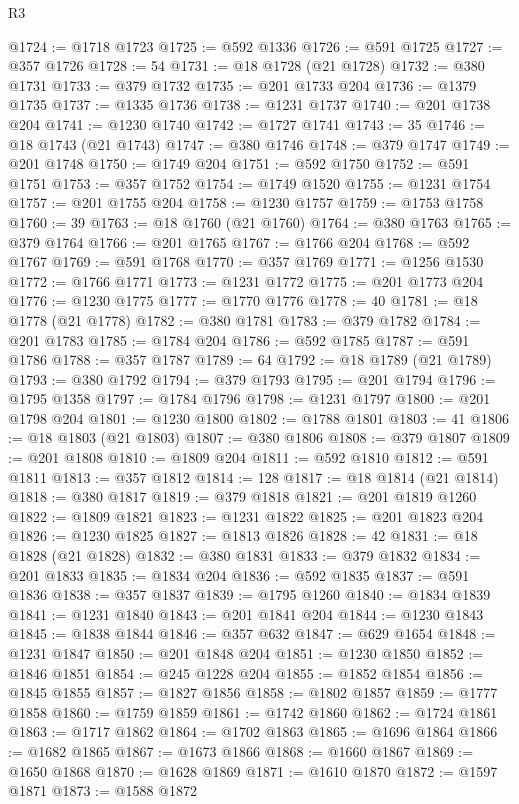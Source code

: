 \begin{lexlean}{R3}
\begin{coremodule}
@1724 := @1718 @1723
@1725 := @592 @1336
@1726 := @591 @1725
@1727 := @357 @1726
@1728 := 54
@1731 := @18 @1728 (@21 @1728)
@1732 := @380 @1731
@1733 := @379 @1732
@1735 := @201 @1733 @204
@1736 := @1379 @1735
@1737 := @1335 @1736
@1738 := @1231 @1737
@1740 := @201 @1738 @204
@1741 := @1230 @1740
@1742 := @1727 @1741
@1743 := 35
@1746 := @18 @1743 (@21 @1743)
@1747 := @380 @1746
@1748 := @379 @1747
@1749 := @201 @1748
@1750 := @1749 @204
@1751 := @592 @1750
@1752 := @591 @1751
@1753 := @357 @1752
@1754 := @1749 @1520
@1755 := @1231 @1754
@1757 := @201 @1755 @204
@1758 := @1230 @1757
@1759 := @1753 @1758
@1760 := 39
@1763 := @18 @1760 (@21 @1760)
@1764 := @380 @1763
@1765 := @379 @1764
@1766 := @201 @1765
@1767 := @1766 @204
@1768 := @592 @1767
@1769 := @591 @1768
@1770 := @357 @1769
@1771 := @1256 @1530
@1772 := @1766 @1771
@1773 := @1231 @1772
@1775 := @201 @1773 @204
@1776 := @1230 @1775
@1777 := @1770 @1776
@1778 := 40
@1781 := @18 @1778 (@21 @1778)
@1782 := @380 @1781
@1783 := @379 @1782
@1784 := @201 @1783
@1785 := @1784 @204
@1786 := @592 @1785
@1787 := @591 @1786
@1788 := @357 @1787
@1789 := 64
@1792 := @18 @1789 (@21 @1789)
@1793 := @380 @1792
@1794 := @379 @1793
@1795 := @201 @1794
@1796 := @1795 @1358
@1797 := @1784 @1796
@1798 := @1231 @1797
@1800 := @201 @1798 @204
@1801 := @1230 @1800
@1802 := @1788 @1801
@1803 := 41
@1806 := @18 @1803 (@21 @1803)
@1807 := @380 @1806
@1808 := @379 @1807
@1809 := @201 @1808
@1810 := @1809 @204
@1811 := @592 @1810
@1812 := @591 @1811
@1813 := @357 @1812
@1814 := 128
@1817 := @18 @1814 (@21 @1814)
@1818 := @380 @1817
@1819 := @379 @1818
@1821 := @201 @1819 @1260
@1822 := @1809 @1821
@1823 := @1231 @1822
@1825 := @201 @1823 @204
@1826 := @1230 @1825
@1827 := @1813 @1826
@1828 := 42
@1831 := @18 @1828 (@21 @1828)
@1832 := @380 @1831
@1833 := @379 @1832
@1834 := @201 @1833
@1835 := @1834 @204
@1836 := @592 @1835
@1837 := @591 @1836
@1838 := @357 @1837
@1839 := @1795 @1260
@1840 := @1834 @1839
@1841 := @1231 @1840
@1843 := @201 @1841 @204
@1844 := @1230 @1843
@1845 := @1838 @1844
@1846 := @357 @632
@1847 := @629 @1654
@1848 := @1231 @1847
@1850 := @201 @1848 @204
@1851 := @1230 @1850
@1852 := @1846 @1851
@1854 := @245 @1228 @204
@1855 := @1852 @1854
@1856 := @1845 @1855
@1857 := @1827 @1856
@1858 := @1802 @1857
@1859 := @1777 @1858
@1860 := @1759 @1859
@1861 := @1742 @1860
@1862 := @1724 @1861
@1863 := @1717 @1862
@1864 := @1702 @1863
@1865 := @1696 @1864
@1866 := @1682 @1865
@1867 := @1673 @1866
@1868 := @1660 @1867
@1869 := @1650 @1868
@1870 := @1628 @1869
@1871 := @1610 @1870
@1872 := @1597 @1871
@1873 := @1588 @1872

\end{coremodule}
\end{lexlean}
